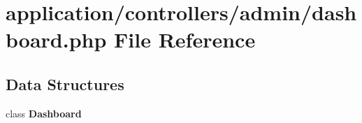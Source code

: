 \section{application/controllers/admin/dashboard.php File Reference}
\label{dashboard_8php}
\subsection*{Data Structures}
\begin{DoxyCompactItemize}
\item 
class {\bf Dashboard}
\end{DoxyCompactItemize}
